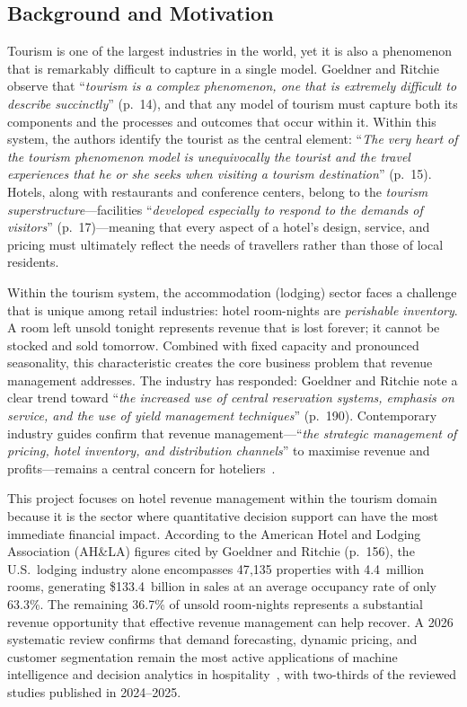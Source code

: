 \subsection{Background and Motivation}

Tourism is one of the largest industries in the world, yet it is also a phenomenon that is remarkably difficult to capture in a single model. Goeldner and Ritchie~\cite{goeldner2009} observe that ``\emph{tourism is a complex phenomenon, one that is extremely difficult to describe succinctly}'' (p.~14), and that any model of tourism must capture both its components and the processes and outcomes that occur within it. Within this system, the authors identify the tourist as the central element: ``\emph{The very heart of the tourism phenomenon model is unequivocally the tourist and the travel experiences that he or she seeks when visiting a tourism destination}'' (p.~15). Hotels, along with restaurants and conference centers, belong to the \emph{tourism superstructure}---facilities ``\emph{developed especially to respond to the demands of visitors}'' (p.~17)---meaning that every aspect of a hotel's design, service, and pricing must ultimately reflect the needs of travellers rather than those of local residents.

Within the tourism system, the accommodation (lodging) sector faces a challenge that is unique among retail industries: hotel room-nights are \emph{perishable inventory}. A room left unsold tonight represents revenue that is lost forever; it cannot be stocked and sold tomorrow. Combined with fixed capacity and pronounced seasonality, this characteristic creates the core business problem that revenue management addresses. The industry has responded: Goeldner and Ritchie note a clear trend toward ``\emph{the increased use of central reservation systems, emphasis on service, and the use of yield management techniques}'' (p.~190). Contemporary industry guides confirm that revenue management---``\emph{the strategic management of pricing, hotel inventory, and distribution channels}'' to maximise revenue and profits---remains a central concern for hoteliers~\cite{amadeus2023}.

This project focuses on hotel revenue management within the tourism domain because it is the sector where quantitative decision support can have the most immediate financial impact. According to the American Hotel and Lodging Association (AH\&LA) figures cited by Goeldner and Ritchie (p.~156), the U.S.~lodging industry alone encompasses 47{,}135 properties with 4.4~million rooms, generating \$133.4~billion in sales at an average occupancy rate of only 63.3\%. The remaining 36.7\% of unsold room-nights represents a substantial revenue opportunity that effective revenue management can help recover.
A 2026 systematic review confirms that demand forecasting, dynamic pricing, and customer segmentation remain the most active applications of machine intelligence and decision analytics in hospitality~\cite{jawabreh2026}, with two-thirds of the reviewed studies published in 2024--2025.


